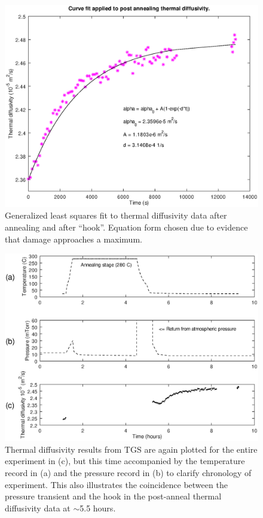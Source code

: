 \begin{figure}[pt]
\begin{center}
\includegraphics[width=\textwidth]{./images/curve_fit.eps} 
\caption{Generalized least squares fit to thermal diffusivity data after annealing and after ``hook''. Equation form chosen due to evidence that damage approaches a maximum.}
\label{curve_fit}
\end{center}
\end{figure}


\begin{figure}[pt]
\begin{center}
\includegraphics[width=\textwidth]{./images/T_P_alpha_subplots.eps}
\caption{Thermal diffusivity results from TGS are again plotted for the entire experiment in (c), but this time accompanied by the temperature record in (a) and the pressure record in (b) to clarify chronology of experiment. This also illustrates the coincidence between the pressure transient and the hook in the post-anneal thermal diffusivity data at $\sim$5.5 hours.}
\label{T_P_alpha_subplots}
\end{center}
\end{figure}


